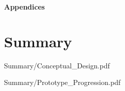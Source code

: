 \documentclass[a4 paper, 12pt]{article}
\begin{document}
\pagebreak
\begin{center}
    \Huge \textbf{Appendices}
    \section{Summary}
\end{center}


    \pagebreak     
    
                    {Summary/Conceptual_Design.pdf}
                    \label{sec:D.1}

    \pagebreak   
    \label{sec:D.2}  
    
                    {Summary/Prototype_Progression.pdf}
                    
\end{document}
